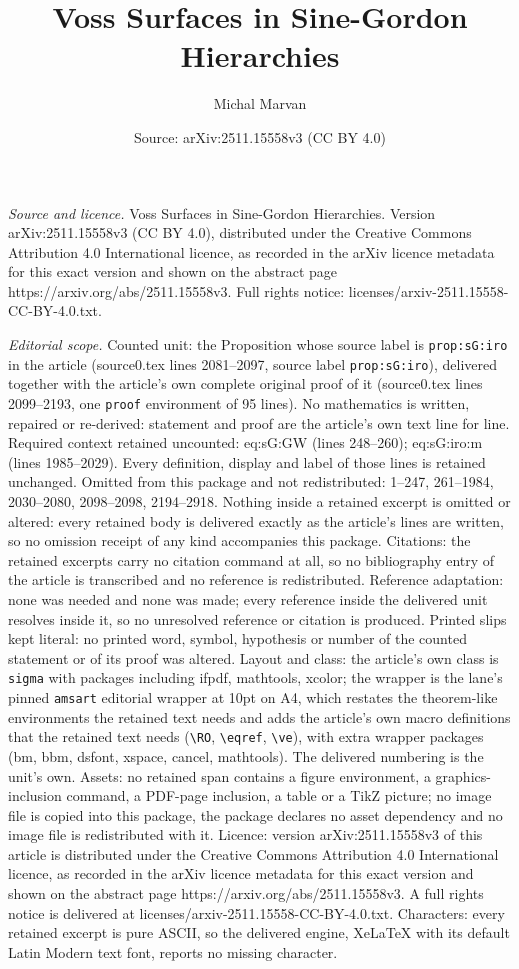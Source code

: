 \documentclass[10pt,a4paper]{amsart}
\title[Voss Surfaces in Sine-Gordon Hierarchies]{Voss Surfaces in Sine-Gordon Hierarchies}
\author{Michal Marvan}
\date{Source: arXiv:2511.15558v3 (CC BY 4.0)}
\begin{document}
\maketitle

\noindent\emph{Source and licence.} Voss Surfaces in Sine-Gordon Hierarchies. Version arXiv:2511.15558v3 (CC BY 4.0), distributed under the Creative Commons Attribution 4.0 International licence, as recorded in the arXiv licence metadata for this exact version and shown on the abstract page https://arxiv.org/abs/2511.15558v3. Full rights notice: licenses/arxiv-2511.15558-CC-BY-4.0.txt.\par\smallskip

\noindent\textit{Editorial scope.} Counted unit: the Proposition whose source label is \texttt{prop:sG:iro} in the article (source0.tex lines 2081--2097, source label \texttt{prop:sG:iro}), delivered together with the article's own complete original proof of it (source0.tex lines 2099--2193, one \texttt{proof} environment of 95 lines). No mathematics is written, repaired or re-derived: statement and proof are the article's own text line for line. Required context retained uncounted: eq:sG:GW (lines 248--260); eq:sG:iro:m (lines 1985--2029). Every definition, display and label of those lines is retained unchanged. Omitted from this package and not redistributed: 1--247, 261--1984, 2030--2080, 2098--2098, 2194--2918. Nothing inside a retained excerpt is omitted or altered: every retained body is delivered exactly as the article's lines are written, so no omission receipt of any kind accompanies this package. Citations: the retained excerpts carry no citation command at all, so no bibliography entry of the article is transcribed and no reference is redistributed. Reference adaptation: none was needed and none was made; every reference inside the delivered unit resolves inside it, so no unresolved reference or citation is produced. Printed slips kept literal: no printed word, symbol, hypothesis or number of the counted statement or of its proof was altered. Layout and class: the article's own class is \texttt{sigma} with packages including ifpdf, mathtools, xcolor; the wrapper is the lane's pinned \texttt{amsart} editorial wrapper at 10pt on A4, which restates the theorem-like environments the retained text needs and adds the article's own macro definitions that the retained text needs (\texttt{\textbackslash RO}, \texttt{\textbackslash eqref}, \texttt{\textbackslash ve}), with extra wrapper packages (bm, bbm, dsfont, xspace, cancel, mathtools). The delivered numbering is the unit's own. Assets: no retained span contains a figure environment, a graphics-inclusion command, a PDF-page inclusion, a table or a TikZ picture; no image file is copied into this package, the package declares no asset dependency and no image file is redistributed with it. Licence: version arXiv:2511.15558v3 of this article is distributed under the Creative Commons Attribution 4.0 International licence, as recorded in the arXiv licence metadata for this exact version and shown on the abstract page https://arxiv.org/abs/2511.15558v3. A full rights notice is delivered at licenses/arxiv-2511.15558-CC-BY-4.0.txt. Characters: every retained excerpt is pure ASCII, so the delivered engine, XeLaTeX with its default Latin Modern text font, reports no missing character.
\end{document}
